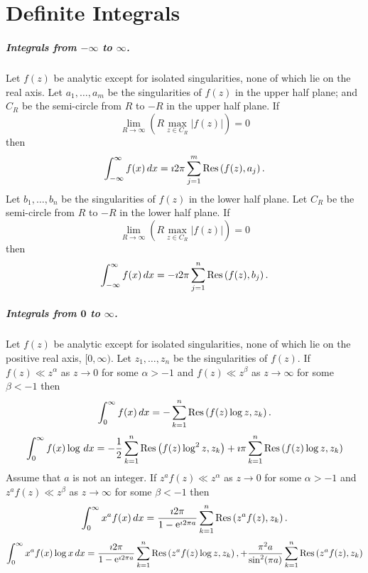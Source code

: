 








\raggedbottom
\chapter{Definite Integrals}
\label{definite_integrals}
\flushbottom


\paragraph{Integrals from $\boldsymbol{-} \boldsymbol{\infty}$ 
to $\boldsymbol{\infty}$.}
Let $f(z)$ be analytic except for isolated singularities, none of which
lie on the real axis.
Let $a_1,\ldots,a_m$ be the singularities of $f(z)$ in the upper half plane;
and $C_R$ be the semi-circle from $R$ to $-R$ in the upper half plane.
If
\[
\lim_{R \to \infty} \left( R \max_{z \in C_R} |f(z)| \right) = 0
\]
then
\[
\int_{-\infty}^\infty f(x) \,d x = \imath 2 \pi \sum_{j=1}^m \mathop{\mathrm{Res}}\nolimits \left( f(z), a_j \right).
\]
Let $b_1,\ldots,b_n$ be the singularities of $f(z)$ in the lower half plane.
Let $C_R$ be the semi-circle from $R$ to $-R$ in the lower half plane.
If
\[
\lim_{R \to \infty} \left( R \max_{z \in C_R} |f(z)| \right) = 0
\]
then
\[
\int_{-\infty}^\infty f(x) \,d x = - \imath 2 \pi \sum_{j=1}^n \mathop{\mathrm{Res}}\nolimits \left( f(z), b_j \right).
\]





\paragraph{Integrals from $\mathbf{0}$ to $\boldsymbol{\infty}$.}
Let $f(z)$ be analytic except for isolated singularities, none of which
lie on the positive real axis, $[0,\infty)$.
Let $z_1,\ldots,z_n$ be the singularities of $f(z)$.
If $f(z) \ll z^\alpha$ as $z \to 0$ for some $\alpha > -1$ and 
$f(z) \ll z^\beta$ as $z \to \infty$ for some $\beta < -1$ then
\[
\int_0^\infty f(x)\,d x = - \sum_{k = 1}^n \mathop{\mathrm{Res}}\nolimits \left( f(z) \log z, z_k \right).
\]
\[
\int_0^\infty f(x) \log \,d x
= - \frac{1}{2} \sum_{k=1}^n \mathop{\mathrm{Res}}\nolimits \left( f(z) \log^2 z, z_k \right)
+ \imath \pi \sum_{k=1}^n \mathop{\mathrm{Res}}\nolimits \left( f(z) \log z, z_k \right)
\]
Assume that $a$ is not an integer.
If $z^a f(z) \ll z^\alpha$ as $z \to 0$ for some $\alpha > -1$ and 
$z^a f(z) \ll z^\beta$ as $z \to \infty$ for some $\beta < -1$ then
\[
\int_0^\infty x^a f(x)\,d x = \frac{ \imath 2 \pi }{ 1 - \mathop{\mathrm{e}}\nolimits^{\imath 2 \pi a} } 
\sum_{k = 1}^n \mathop{\mathrm{Res}}\nolimits \left( z^a f(z), z_k \right).
\]
\[
\int_0^\infty x^a f(x) \log x \,d x
= \frac{ \imath 2 \pi }{ 1 - \mathop{\mathrm{e}}\nolimits^{\imath 2 \pi a} }
\sum_{k=1}^n \mathop{\mathrm{Res}}\nolimits \left( z^a f(z) \log z, z_k \right),
+ \frac{ \pi^2 a }{ \sin^2 (\pi a) }
\sum_{k=1}^n \mathop{\mathrm{Res}}\nolimits \left( z^a f(z), z_k \right)
\]




